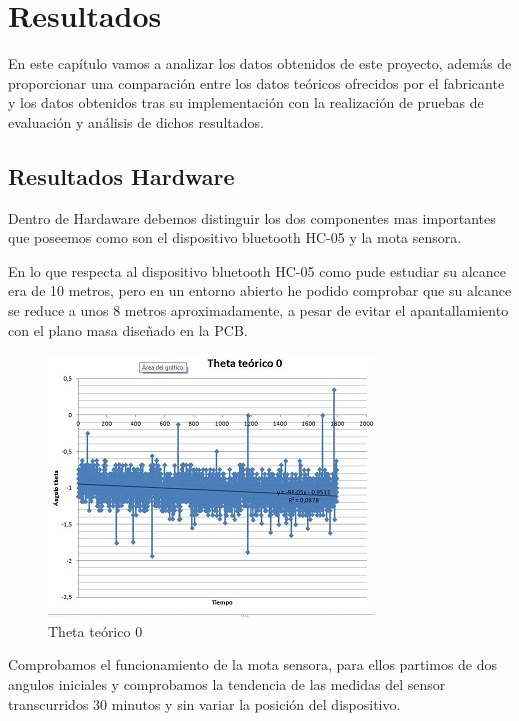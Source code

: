 	\chapter{Resultados}\label{cap.resultados}
	
	En este capítulo vamos a analizar los datos obtenidos de este proyecto, además de proporcionar una comparación entre los datos teóricos ofrecidos por el fabricante y los datos obtenidos tras su implementación con la realización de pruebas de evaluación y análisis de dichos resultados.
	

	
	\section{Resultados Hardware}
	
	Dentro de Hardaware debemos distinguir los dos componentes mas importantes que poseemos como son el dispositivo bluetooth HC-05 y la mota sensora.
	
	En lo que respecta al dispositivo bluetooth HC-05 \cite{HC05} como pude estudiar su alcance era de 10 metros, pero en un entorno abierto he podido comprobar que su alcance se reduce a unos 8 metros aproximadamente, a pesar de evitar el apantallamiento con el plano masa dise\~nado en la PCB.
	

	
	\begin{figure}[h]
		\centering
		\includegraphics{imagenes/theta0.jpg}
		\caption{Theta teórico 0}
		\label{contexto:figura}
	\end{figure}
	
	Comprobamos el funcionamiento de la mota sensora, para ellos partimos de dos angulos iniciales y comprobamos la tendencia de las medidas del sensor transcurridos 30 minutos y sin variar la posición del dispositivo.
	
